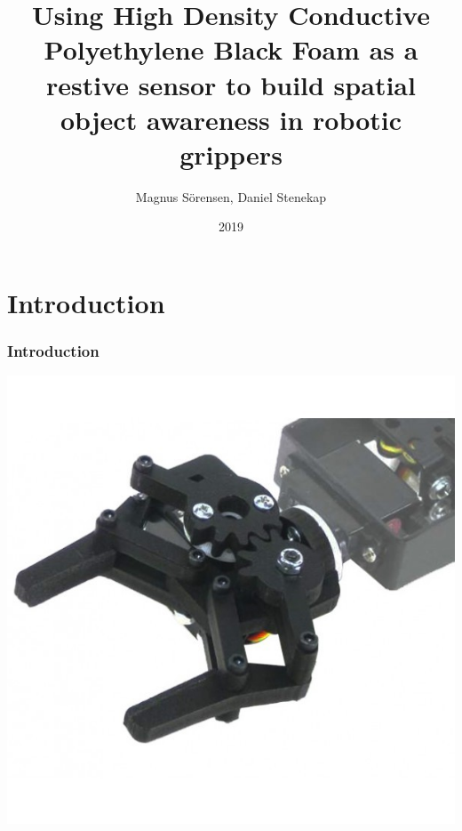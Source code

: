 \documentclass{beamer}
\title{Using High Density Conductive
Polyethylene Black Foam as a restive sensor to
build spatial object awareness in robotic grippers}
\author{Magnus Sörensen, Daniel Stenekap}
\institute{Märlardalens högskola}
\date{2019}
\begin{document}
\frame{\titlepage}


\begin{frame}
    \tableofcontents
\end{frame}

\section{Introduction}%
\label{sec:intro}

\begin{frame}
    \frametitle{Introduction}

    \begin{center}
        \includegraphics[width=.5\textwidth]{img/rob0078.jpg}
    \end{center}
\end{frame}
\end{document}

